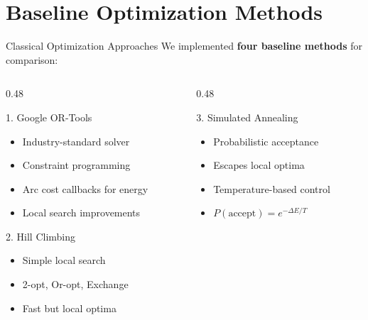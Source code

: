 \documentclass[aspectratio=169,11pt]{beamer}
\begin{document}
\section{Baseline Optimization Methods}

\begin{frame}{Classical Optimization Approaches}
    We implemented \textbf{four baseline methods} for comparison:
    
    \vspace{0.5cm}
    \begin{columns}[T]
        \begin{column}{0.48\textwidth}
            \begin{block}{1. Google OR-Tools}
                \begin{itemize}
                    \item Industry-standard solver
                    \item Constraint programming
                    \item Arc cost callbacks for energy
                    \item Local search improvements
                \end{itemize}
            \end{block}
            
            \begin{block}{2. Hill Climbing}
                \begin{itemize}
                    \item Simple local search
                    \item 2-opt, Or-opt, Exchange
                    \item Fast but local optima
                \end{itemize}
            \end{block}
        \end{column}
        \begin{column}{0.48\textwidth}
            \begin{block}{3. Simulated Annealing}
                \begin{itemize}
                    \item Probabilistic acceptance
                    \item Escapes local optima
                    \item Temperature-based control
                    \item $P(\text{accept}) = e^{-\Delta E/T}$
                \end{itemize}
            \end{block}
            

\end{column}
\end{columns}
\end{frame}
\end{document}
